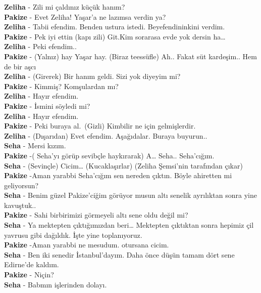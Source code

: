 \documentclass[]{book}
\begin{document}
\textbf{Zeliha} - Zili mi çaldınız küçük hanım?\\
\textbf{Pakize} - Evet Zeliha! Yaşar'a ne lazımsa verdin ya?\\
\textbf{Zeliha} - Tabii efendim. Benden ustura istedi. Beyefendininkini verdim.\\
\textbf{Pakize} - Pek iyi ettin (kapı zili) Git.Kim sorarasa evde yok dersin ha\ldots{}\\
\textbf{Zeliha} - Peki efendim..\\
\textbf{Pakize} - (Yalnız) hay Yaşar hay. (Biraz teessüfle) Ah.. Fakat süt kardeşim.. Hem de bir aşcı\\
\textbf{Zeliha} - (Girerek) Bir hanım geldi. Sizi yok diyeyim mi?\\
\textbf{Pakize} - Kimmiş? Komşulardan mı?\\
\textbf{Zeliha} - Hayır efendim.\\
\textbf{Pakize} - İsmini söyledi mi?\\
\textbf{Zeliha} - Hayır efendim.\\
\textbf{Pakize} - Peki buraya al.~(Gizli) Kimbilir ne için gelmişlerdir.\\
\textbf{Zeliha} - (Dışarıdan) Evet efendim. Aşağıdalar. Buraya buyurun..\\
\textbf{Seha} - Mersi kızım.\\
\textbf{Pakize} -( Seha'yı görüp sevibçle haykırarak) A\ldots{} Seha.. Seha'cığım.\\
\textbf{Seha} - (Sevinçle) Cicim\ldots{} (Kucaklaşırlar) (Zeliha Şemsi'nin tarafından çıkar)\\
\textbf{Pakize} -Aman yarabbi Seha'cığım sen nereden çıktın. Böyle ahiretten mi geliyorsun?\\
\textbf{Seha} - Benim güzel Pakize'ciğim görüyor musun altı senelik ayrılıktan sonra yine kavuştuk..\\
\textbf{Pakize} - Sahi birbirimizi görmeyeli altı sene oldu değil mi?\\
\textbf{Seha} - Ya mektepten çıktığımızdan beri\ldots{} Mektepten çıktıktan sonra hepimiz çil yavrusu gibi dağıldık. İşte yine toplanıyoruz.\\
\textbf{Pakize} -Aman yarabbi ne mesudum. otursana cicim.\\
\textbf{Seha} - Ben iki senedir İstanbul'dayım. Daha önce düşün tamam dört sene Edirne'de kaldım.\\
\textbf{Pakize} - Niçin?\\
\textbf{Seha} - Babmın işlerinden dolayı.\\
\end{document}

